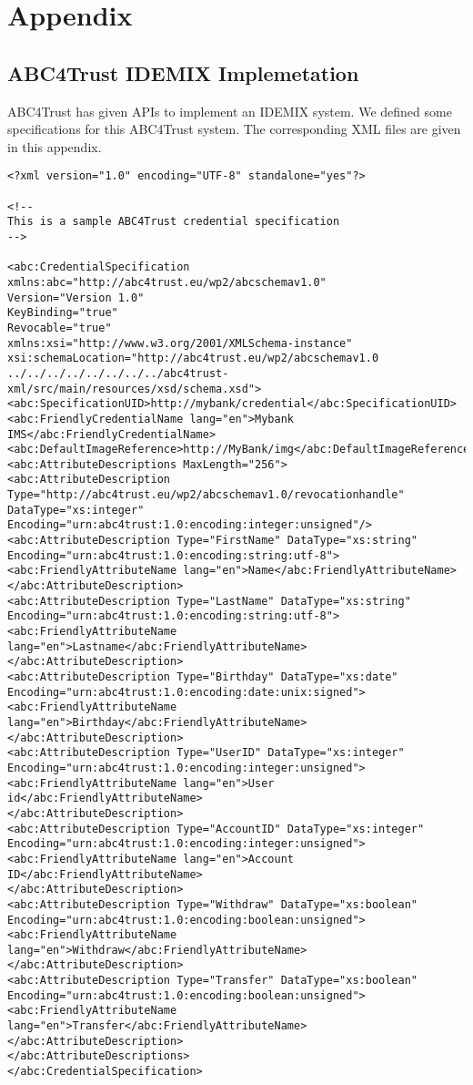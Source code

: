 \chapter{Appendix}
\section{ABC4Trust IDEMIX Implemetation}
ABC4Trust has given APIs\cite{bichsel2013h2}\cite{camenisch2012h2} to implement an IDEMIX system. We defined some specifications for this ABC4Trust system. The corresponding XML files are given in this appendix.

\lstset{language=XML}
\begin{lstlisting}[caption=IDEMIX Credential Specificataion]
<?xml version="1.0" encoding="UTF-8" standalone="yes"?>

<!--
This is a sample ABC4Trust credential specification
-->

<abc:CredentialSpecification xmlns:abc="http://abc4trust.eu/wp2/abcschemav1.0"
Version="Version 1.0"
KeyBinding="true"
Revocable="true"
xmlns:xsi="http://www.w3.org/2001/XMLSchema-instance" 
xsi:schemaLocation="http://abc4trust.eu/wp2/abcschemav1.0 ../../../../../../../../abc4trust-xml/src/main/resources/xsd/schema.xsd">
<abc:SpecificationUID>http://mybank/credential</abc:SpecificationUID>
<abc:FriendlyCredentialName lang="en">Mybank IMS</abc:FriendlyCredentialName>
<abc:DefaultImageReference>http://MyBank/img</abc:DefaultImageReference>
<abc:AttributeDescriptions MaxLength="256">
<abc:AttributeDescription Type="http://abc4trust.eu/wp2/abcschemav1.0/revocationhandle" DataType="xs:integer" Encoding="urn:abc4trust:1.0:encoding:integer:unsigned"/>
<abc:AttributeDescription Type="FirstName" DataType="xs:string" Encoding="urn:abc4trust:1.0:encoding:string:utf-8">
<abc:FriendlyAttributeName lang="en">Name</abc:FriendlyAttributeName>
</abc:AttributeDescription>
<abc:AttributeDescription Type="LastName" DataType="xs:string" Encoding="urn:abc4trust:1.0:encoding:string:utf-8">
<abc:FriendlyAttributeName lang="en">Lastname</abc:FriendlyAttributeName>
</abc:AttributeDescription>
<abc:AttributeDescription Type="Birthday" DataType="xs:date" Encoding="urn:abc4trust:1.0:encoding:date:unix:signed">
<abc:FriendlyAttributeName lang="en">Birthday</abc:FriendlyAttributeName>
</abc:AttributeDescription>
<abc:AttributeDescription Type="UserID" DataType="xs:integer" Encoding="urn:abc4trust:1.0:encoding:integer:unsigned">
<abc:FriendlyAttributeName lang="en">User id</abc:FriendlyAttributeName>
</abc:AttributeDescription>
<abc:AttributeDescription Type="AccountID" DataType="xs:integer" Encoding="urn:abc4trust:1.0:encoding:integer:unsigned">
<abc:FriendlyAttributeName lang="en">Account ID</abc:FriendlyAttributeName>
</abc:AttributeDescription>
<abc:AttributeDescription Type="Withdraw" DataType="xs:boolean" Encoding="urn:abc4trust:1.0:encoding:boolean:unsigned">
<abc:FriendlyAttributeName lang="en">Withdraw</abc:FriendlyAttributeName>
</abc:AttributeDescription>
<abc:AttributeDescription Type="Transfer" DataType="xs:boolean" Encoding="urn:abc4trust:1.0:encoding:boolean:unsigned">
<abc:FriendlyAttributeName lang="en">Transfer</abc:FriendlyAttributeName>
</abc:AttributeDescription>
</abc:AttributeDescriptions>
</abc:CredentialSpecification>
\end{lstlisting}
